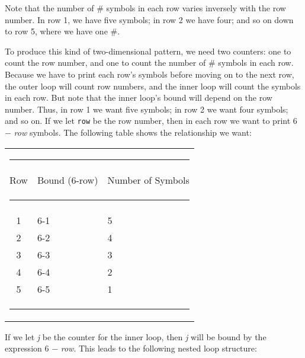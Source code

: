 \noindent Note that the number of \# symbols in each row
varies inversely with the row number.  In row 1, we have five symbols;
in row 2 we have four; and so on down to row 5, where we have one \#.

To produce this kind of two-dimensional pattern, we need two counters:
one to count the row number, and one to count the number of \# symbols
in each row.  Because we have to print each row's symbols before moving on
to the next row, the outer loop will count row numbers, and the inner
loop will count the symbols in each row.  But note that the inner loop's
bound will depend on the row number.  Thus, in row 1 we want five symbols;
in row 2 we want four symbols; and so on.  If we let {\tt row} be the row
number, then in each row we want to print 6 $-$ {\it row} symbols.  The
following table shows the relationship we want:

\begin{table}[h!]
\hspace*{3.5pc}
\begin{tabular}{cll} 
\multicolumn{3}{l}{\color{cyan}\rule{19pc}{1pt}}\\
[2pt] {Row}\hspace*{12pt}&{Bound (6-row)}\hspace*{12pt}&{Number of Symbols} \\
[-6pt]\multicolumn{3}{l}{\color{cyan}\rule{19pc}{0.5pt}}\\ [2pt]
1 & 6-1 & 5   \\
2 & 6-2 & 4 \\
3 & 6-3 & 3 \\
4 & 6-4 & 2 \\
5 & 6-5 & 1 
\\[-8pt]\multicolumn{3}{l}{\color{cyan}\rule{19pc}{1pt}}
\end{tabular}
\endTB
\end{table}


\noindent If we let {\it j} be the counter for the inner loop,
then {\it j} will be bound by the expression 6 $-$ {\it row}.
This leads to the following nested loop structure:


